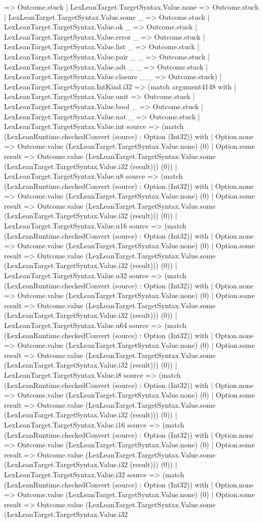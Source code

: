 \documentclass[11pt]{article}
\begin{document}
=> Outcome.stuck | LexLeanTarget.TargetSyntax.Value.none => Outcome.stuck | LexLeanTarget.TargetSyntax.Value.some \_ => Outcome.stuck | LexLeanTarget.TargetSyntax.Value.ok \_ => Outcome.stuck | LexLeanTarget.TargetSyntax.Value.error \_ => Outcome.stuck | LexLeanTarget.TargetSyntax.Value.list \_ => Outcome.stuck | LexLeanTarget.TargetSyntax.Value.pair \_ \_ => Outcome.stuck | LexLeanTarget.TargetSyntax.Value.adt \_ \_ => Outcome.stuck | LexLeanTarget.TargetSyntax.Value.closure \_ \_ => Outcome.stuck) | LexLeanTarget.TargetSyntax.IntKind.i32 => (match argument4148 with | LexLeanTarget.TargetSyntax.Value.unit => Outcome.stuck | LexLeanTarget.TargetSyntax.Value.bool \_ => Outcome.stuck | LexLeanTarget.TargetSyntax.Value.nat \_ => Outcome.stuck | LexLeanTarget.TargetSyntax.Value.int source => (match (LexLeanRuntime.checkedConvert (source) : Option (Int32)) with | Option.none => Outcome.value (LexLeanTarget.TargetSyntax.Value.none) (0) | Option.some result => Outcome.value (LexLeanTarget.TargetSyntax.Value.some (LexLeanTarget.TargetSyntax.Value.i32 (result))) (0)) | LexLeanTarget.TargetSyntax.Value.u8 source => (match (LexLeanRuntime.checkedConvert (source) : Option (Int32)) with | Option.none => Outcome.value (LexLeanTarget.TargetSyntax.Value.none) (0) | Option.some result => Outcome.value (LexLeanTarget.TargetSyntax.Value.some (LexLeanTarget.TargetSyntax.Value.i32 (result))) (0)) | LexLeanTarget.TargetSyntax.Value.u16 source => (match (LexLeanRuntime.checkedConvert (source) : Option (Int32)) with | Option.none => Outcome.value (LexLeanTarget.TargetSyntax.Value.none) (0) | Option.some result => Outcome.value (LexLeanTarget.TargetSyntax.Value.some (LexLeanTarget.TargetSyntax.Value.i32 (result))) (0)) | LexLeanTarget.TargetSyntax.Value.u32 source => (match (LexLeanRuntime.checkedConvert (source) : Option (Int32)) with | Option.none => Outcome.value (LexLeanTarget.TargetSyntax.Value.none) (0) | Option.some result => Outcome.value (LexLeanTarget.TargetSyntax.Value.some (LexLeanTarget.TargetSyntax.Value.i32 (result))) (0)) | LexLeanTarget.TargetSyntax.Value.u64 source => (match (LexLeanRuntime.checkedConvert (source) : Option (Int32)) with | Option.none => Outcome.value (LexLeanTarget.TargetSyntax.Value.none) (0) | Option.some result => Outcome.value (LexLeanTarget.TargetSyntax.Value.some (LexLeanTarget.TargetSyntax.Value.i32 (result))) (0)) | LexLeanTarget.TargetSyntax.Value.i8 source => (match (LexLeanRuntime.checkedConvert (source) : Option (Int32)) with | Option.none => Outcome.value (LexLeanTarget.TargetSyntax.Value.none) (0) | Option.some result => Outcome.value (LexLeanTarget.TargetSyntax.Value.some (LexLeanTarget.TargetSyntax.Value.i32 (result))) (0)) | LexLeanTarget.TargetSyntax.Value.i16 source => (match (LexLeanRuntime.checkedConvert (source) : Option (Int32)) with | Option.none => Outcome.value (LexLeanTarget.TargetSyntax.Value.none) (0) | Option.some result => Outcome.value (LexLeanTarget.TargetSyntax.Value.some (LexLeanTarget.TargetSyntax.Value.i32 (result))) (0)) | LexLeanTarget.TargetSyntax.Value.i32 source => (match (LexLeanRuntime.checkedConvert (source) : Option (Int32)) with | Option.none => Outcome.value (LexLeanTarget.TargetSyntax.Value.none) (0) | Option.some result => Outcome.value (LexLeanTarget.TargetSyntax.Value.some (LexLeanTarget.TargetSyntax.Value.i32 
\end{document}
